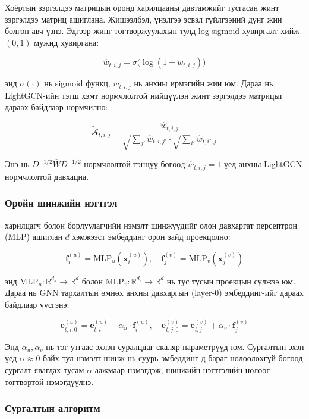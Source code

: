 \documentclass[conference]{IEEEtran}
\begin{document}
Хоёртын зэргэлдээ матрицын оронд харилцааны давтамжийг тусгасан жинт зэргэлдээ матриц ашиглана. Жишээлбэл, үнэлгээ эсвэл гүйлгээний дүнг жин болгон авч үзнэ. Эдгээр жинг тогтворжуулахын тулд log-sigmoid хувиргалт хийж $(0,1)$ мужид хувиргана:
 
\[
\hat{w}_{t,i,j} = \sigma\bigl(\log(1 + w_{t,i,j})\bigr)
\]
 
\noindent энд $\sigma(\cdot)$ нь sigmoid функц, $w_{t,i,j}$ нь анхны ирмэгийн жин юм. Дараа нь LightGCN-ийн тэгш хэмт нормчлолтой нийцүүлэн жинт зэргэлдээ матрицыг дараах байдлаар нормчилно:
 
\[
\widetilde{\mathcal{A}}_{t,i,j} = 
\frac{\hat{w}_{t,i,j}}{\sqrt{\sum_{j'} \hat{w}_{t,i,j'}} \cdot \sqrt{\sum_{i'} \hat{w}_{t,i',j}}}
\]
 
\noindent Энэ нь $D^{-1/2}\hat{W}D^{-1/2}$ нормчлолтой тэнцүү бөгөөд $\hat{w}_{t,i,j} = 1$ үед анхны LightGCN нормчлолтой давхацна.
 
\subsubsection{Оройн шинжийн нэгтгэл}
 
харилцагч болон борлуулагчийн нэмэлт шинжүүдийг олон давхаргат персептрон (MLP) ашиглан $d$ хэмжээст эмбеддинг орон зайд проекцолно:
 
\[
\mathbf{f}_i^{(u)} = \text{MLP}_u(\mathbf{x}_i^{(u)}), \quad
\mathbf{f}_j^{(v)} = \text{MLP}_v(\mathbf{x}_j^{(v)})
\]
 
\noindent энд $\text{MLP}_u: \mathbb{R}^{d_u} \to \mathbb{R}^{d}$ болон $\text{MLP}_v: \mathbb{R}^{d_v} \to \mathbb{R}^{d}$ нь тус тусын проекцын сүлжээ юм. Дараа нь GNN тархалтын өмнөх анхны давхаргын (layer-0) эмбеддинг-ийг дараах байдлаар үүсгэнэ:
 
\[
\mathbf{e}_{t,i,0}^{(u)} = \mathbf{e}_{t,i}^{(u)} + \alpha_u \cdot \mathbf{f}_i^{(u)}, \quad
\mathbf{e}_{t,j,0}^{(v)} = \mathbf{e}_{t,j}^{(v)} + \alpha_v \cdot \mathbf{f}_j^{(v)}
\]

\noindent Энд $\alpha_u, \alpha_v$ нь тэг утгаас эхлэн суралцдаг скаляр параметрүүд юм. Сургалтын эхэн үед $\alpha \approx 0$ байх тул нэмэлт шинж нь суурь эмбеддинг-д бараг нөлөөлөхгүй бөгөөд сургалт явагдах тусам $\alpha$ аажмаар нэмэгдэж, шинжийн нэгтгэлийн нөлөөг тогтвортой нэмэгдүүлнэ.

\subsubsection{Сургалтын алгоритм}
\end{document}
